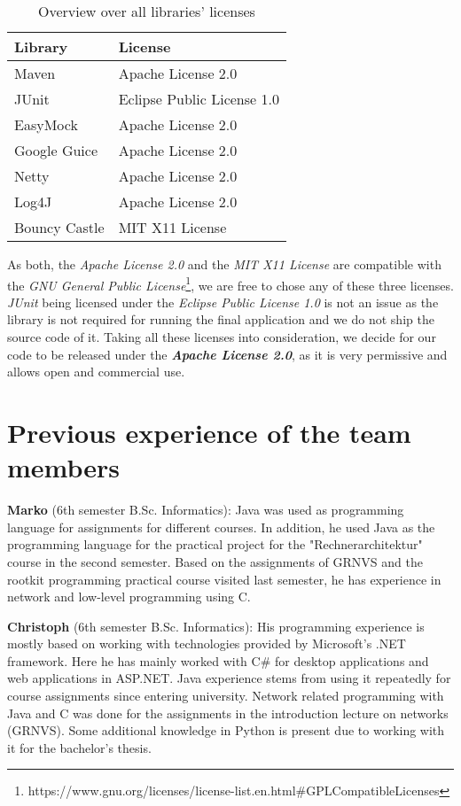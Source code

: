 \documentclass[paper=letter, fontsize=12pt]{article}
\begin{document}
\renewcommand{\arraystretch}{1.5}
\begin{table}[ht]
\centering
\caption{Overview over all libraries' licenses}
\label{tab:licenses}
\begin{tabular}{|l|l|}
\hline
\textbf{Library} & \textbf{License}           \\ \hline
Maven            & Apache License 2.0         \\ \hline
JUnit            & Eclipse Public License 1.0 \\ \hline
EasyMock         & Apache License 2.0         \\ \hline
Google Guice     & Apache License 2.0         \\ \hline
Netty            & Apache License 2.0         \\ \hline
Log4J            & Apache License 2.0         \\ \hline
Bouncy Castle    & MIT X11 License            \\ \hline
\end{tabular}
\end{table}

As both, the \emph{Apache License 2.0} and the \emph{MIT X11 License} are compatible with the \emph{GNU General Public License}\footnote{https://www.gnu.org/licenses/license-list.en.html\#GPLCompatibleLicenses}, we are free to chose any of these three licenses. \emph{JUnit} being licensed under the \emph{Eclipse Public License 1.0} is not an issue as the library is not required for running the final application and we do not ship the source code of it.
Taking all these licenses into consideration, we decide for our code to be released under the \textbf{\emph{Apache License 2.0}}, as it is very permissive and allows open and commercial use.

\section{Previous experience of the team members}
\textbf{Marko} (6th semester B.Sc. Informatics): Java was used as programming language for assignments for different courses. In addition, he used Java as the programming language for the practical project for the "Rechnerarchitektur" course in the second semester. Based on the assignments of GRNVS and the rootkit programming practical course visited last semester, he has experience in network and low-level programming using C.

\textbf{Christoph} (6th semester B.Sc. Informatics): His programming experience is mostly based on working with technologies provided by Microsoft's .NET framework. Here he has mainly worked with C\# for desktop applications and web applications in ASP.NET. Java experience stems from using it repeatedly for course assignments since entering university. Network related programming with Java and C was done for the assignments in the introduction lecture on networks (GRNVS). Some additional knowledge in Python is present due to working with it for the bachelor's thesis.
\end{document}
